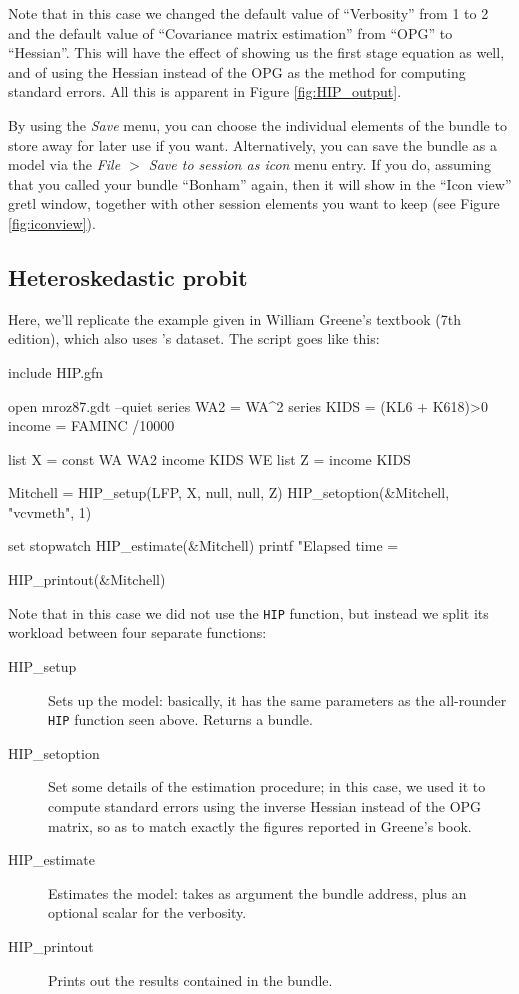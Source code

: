 \documentclass[a4paper,10pt]{article}
\newcounter{script}[section]
\begin{document}
Note that in this case we changed the default value of ``Verbosity''
from 1 to 2 and the default value of ``Covariance matrix estimation''
from ``OPG'' to ``Hessian''. 
%
%
This will have the effect of showing us the first stage
equation as well, and of using the Hessian instead of the OPG as the
method for computing standard errors. All this is apparent in Figure
\ref{fig:HIP_output}.

By using the \emph{Save} menu, you can choose the individual
elements of the bundle to store away for later use if you
want. Alternatively, you can save the bundle as a model via the
\emph{File $>$ Save to session as icon} menu entry. If you do, assuming
that you called your bundle ``Bonham'' again, then it will show in the
``Icon view'' gretl window, together with other session elements you
want to keep (see Figure \ref{fig:iconview}).

\subsection{Heteroskedastic probit}

Here, we'll replicate the example given in William Greene's textbook
(7th edition), which also uses \citeauthor{Mroz87}'s dataset. The
script goes like this:

\begin{code}
include HIP.gfn

open mroz87.gdt --quiet
series WA2 = WA^2
series KIDS = (KL6 + K618)>0
income = FAMINC /10000

list X = const WA WA2 income KIDS WE
list Z = income KIDS

Mitchell = HIP_setup(LFP, X, null, null, Z)
HIP_setoption(&Mitchell, "vcvmeth", 1)
 
set stopwatch
HIP_estimate(&Mitchell)
printf "Elapsed time = %

HIP_printout(&Mitchell)
\end{code}

Note that in this case we did not use the \texttt{HIP} function, but
instead we split its workload between four separate functions:
\begin{description}
\item[HIP\_setup] Sets up the model: basically, it has the same
  parameters as the all-rounder \texttt{HIP} function seen
  above. Returns a bundle.
\item[HIP\_setoption] Set some details of the estimation procedure; in
  this case, we used it to compute standard errors using the inverse
  Hessian instead of the OPG matrix, so as to match exactly the
  figures reported in Greene's book.
\item[HIP\_estimate] Estimates the model: takes as argument the bundle
  address, plus an optional scalar for the verbosity.
\item[HIP\_printout] Prints out the results contained in the bundle.
\end{description}
\end{document}
